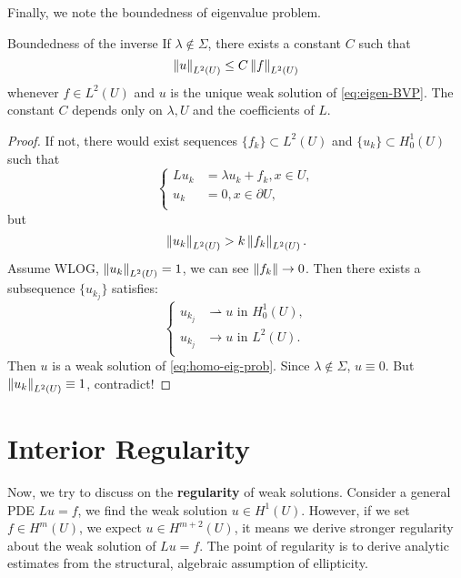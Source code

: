 Finally, we note the boundedness of eigenvalue problem.
\begin{theorem}{Boundedness of the inverse}
If $\lambda\notin\Sigma$, there exists a constant $C$ such that 
\begin{equation}
    \label{eq:bounded}
    \left\|u\right\|_{L^{2}(U)}\le C\left\|f\right\|_{L^{2}(U)}
\end{equation}
whenever $f\in L^{2}(U)$ and $u$ is the unique weak solution of \eqref{eq:eigen-BVP}. The constant $C$ depends only on $\lambda,U$ and the coefficients of $L$.
\end{theorem}
\begin{proof}
    If not, there would exist sequences $\{f_{k}\}\subset L^{2}(U)$ and $\{u_{k}\}\subset H_{0}^{1}(U)$ such that 
    \begin{equation}
        \label{eq:counter}
        \left\{
            \begin{aligned}
        Lu_{k}&=\lambda u_{k}+f_{k},x\in U,\\
        u_{k}&=0,x\in \partial U,\\
            \end{aligned}
        \right.
    \end{equation}
    but 
    \begin{equation}
        \left\|u_{k}\right\|_{L^{2}(U)}>k\left\|f_{k}\right\|_{L^2(U)}.
    \end{equation}
    Assume WLOG, $\left\|u_{k}\right\|_{L^2(U)}=1$, we can see $\left\|f_{k}\right\|\rightarrow 0$. Then there exists a subsequence $\{u_{k_{j}}\}$ satisfies:
    \begin{equation}
        \label{eq:convergence}
        \left\{
            \begin{aligned}
                u_{k_{j}}&\rightharpoonup u\text{ in }H_{0}^{1}(U),\\
                u_{k_{j}}&\rightarrow u\text{ in }L^{2}(U).\\
            \end{aligned}
        \right.
    \end{equation}
    Then $u$ is a weak solution of \eqref{eq:homo-eig-prob}. Since $\lambda\notin\Sigma$, $u\equiv 0$. But $\left\|u_{k}\right\|_{L^{2}(U)}\equiv 1$, contradict!
\end{proof}
\section{Interior Regularity}
Now, we try to discuss on the \textbf{regularity} of weak solutions. Consider a general PDE $Lu=f$, we find the weak solution $u\in H^{1}(U)$. However, if we set $f\in H^{m}(U)$, we expect $u\in H^{m+2}(U)$, it means we derive stronger regularity about the weak solution of $Lu=f$. The point of regularity is to derive analytic estimates from the structural, algebraic assumption of ellipticity.

